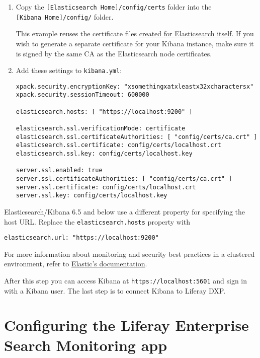 \begin{enumerate}
\def\labelenumi{\arabic{enumi}.}
\item
  Copy the \texttt{{[}Elasticsearch\ Home{]}/config/certs} folder into
  the \texttt{{[}Kibana\ Home{]}/config/} folder.

  This example reuses the certificate files
  \href{/docs/7-2/deployment/-/knowledge_base/u/installing-liferay-enterprise-search-security}{created
  for Elasticsearch itself}. If you wish to generate a separate
  certificate for your Kibana instance, make sure it is signed by the
  same CA as the Elasticsearch node certificates.
\item
  Add these settings to \texttt{kibana.yml}:

\begin{verbatim}
xpack.security.encryptionKey: "xsomethingxatxleastx32xcharactersx"
xpack.security.sessionTimeout: 600000

elasticsearch.hosts: [ "https://localhost:9200" ]

elasticsearch.ssl.verificationMode: certificate
elasticsearch.ssl.certificateAuthorities: [ "config/certs/ca.crt" ]
elasticsearch.ssl.certificate: config/certs/localhost.crt
elasticsearch.ssl.key: config/certs/localhost.key

server.ssl.enabled: true
server.ssl.certificateAuthorities: [ "config/certs/ca.crt" ]
server.ssl.certificate: config/certs/localhost.crt
server.ssl.key: config/certs/localhost.key
\end{verbatim}
\end{enumerate}

Elasticsearch/Kibana 6.5 and below use a different property for
specifying the host URL. Replace the \texttt{elasticsearch.hosts}
property with

\begin{verbatim}
elasticsearch.url: "https://localhost:9200"
\end{verbatim}

For more information about monitoring and security best practices in a
clustered environment, refer to
\href{https://www.elastic.co/guide/en/elasticsearch/reference/7.x/setup-xpack.html}{Elastic's
documentation}.

After this step you can access Kibana at \texttt{https://localhost:5601}
and sign in with a Kibana user. The last step is to connect Kibana to
Liferay DXP.

\section{Configuring the Liferay Enterprise Search Monitoring
app}\label{configuring-the-liferay-enterprise-search-monitoring-app}

